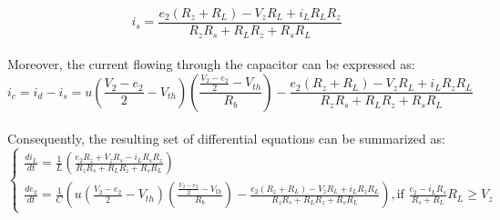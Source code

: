 \begin{equation}
    i_s=\frac{e_2(R_z+R_L)-V_zR_L+i_LR_LR_z}{R_zR_s+R_LR_z+R_sR_L}
\end{equation}\\

Moreover, the current flowing through the capacitor can be expressed as:\\

\begin{equation}
    i_c=i_d-i_s=u(\frac{V_2-e_2}{2}-V_{th})(\frac{\frac{V_2-e_2}{2}-V_{th}}{R_b})-\frac{e_2(R_z+R_L)-V_zR_L+i_LR_zR_L}{R_zR_s+R_LR_z+R_sR_L}
\end{equation}\\

Consequently, the resulting set of differential equations can be summarized as:\\

\begin{equation}
    \begin{cases}
        \frac{di_L}{dt}=\frac{1}{L}(\frac{e_2R_z+V_zR_s-i_LR_sR_z}{R_zR_s+R_LR_z+R_sR_L})\\
        \frac{de_2}{dt}=\frac{1}{C}(u(\frac{V_2-e_2}{2}-V_{th})(\frac{\frac{V_2-e_2}{2}-V_{th}}{R_b})-\frac{e_2(R_z+R_L)-V_zR_L+i_LR_zR_L}{R_zR_s+R_LR_z+R_sR_L}),  \text{if } \frac{e_2-i_LR_s}{R_s+R_L}R_L \geq V_z
    \end{cases}
\end{equation}\\



